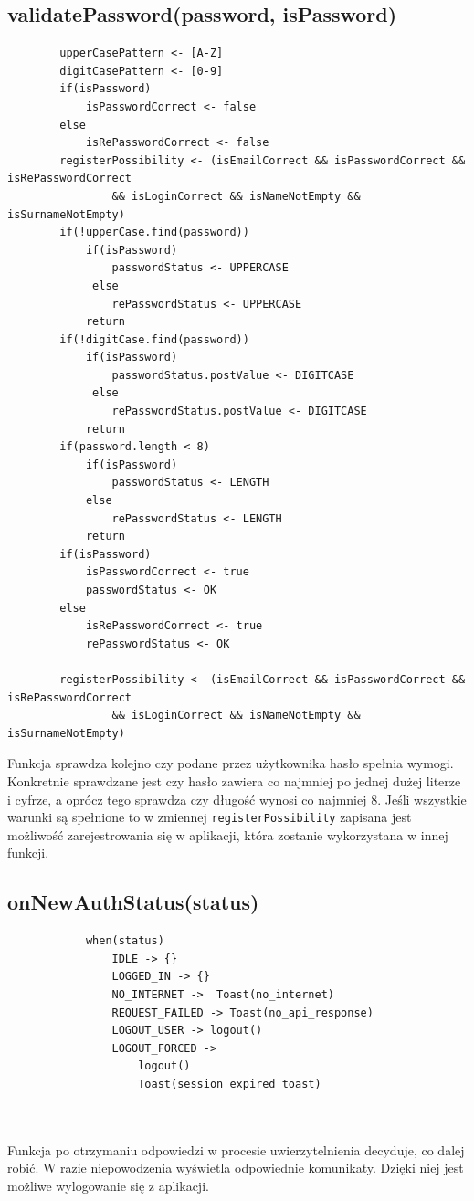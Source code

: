 \documentclass[polish, 11pt]{article}
\begin{document}
    \subsection{validatePassword(password, isPassword)}
         \begin{lstlisting}
        upperCasePattern <- [A-Z]
        digitCasePattern <- [0-9]
        if(isPassword)
            isPasswordCorrect <- false
        else 
            isRePasswordCorrect <- false
        registerPossibility <- (isEmailCorrect && isPasswordCorrect && isRePasswordCorrect
                && isLoginCorrect && isNameNotEmpty && isSurnameNotEmpty)
        if(!upperCase.find(password))
            if(isPassword)
                passwordStatus <- UPPERCASE
             else
                rePasswordStatus <- UPPERCASE
            return
        if(!digitCase.find(password))
            if(isPassword)
                passwordStatus.postValue <- DIGITCASE
             else
                rePasswordStatus.postValue <- DIGITCASE
            return
        if(password.length < 8)
            if(isPassword)
                passwordStatus <- LENGTH
            else
                rePasswordStatus <- LENGTH
            return
        if(isPassword)
            isPasswordCorrect <- true
            passwordStatus <- OK
        else 
            isRePasswordCorrect <- true
            rePasswordStatus <- OK
        
        registerPossibility <- (isEmailCorrect && isPasswordCorrect && isRePasswordCorrect
                && isLoginCorrect && isNameNotEmpty && isSurnameNotEmpty)
         \end{lstlisting}
         Funkcja sprawdza kolejno czy podane przez użytkownika hasło spełnia wymogi. Konkretnie sprawdzane jest czy hasło zawiera co najmniej po jednej dużej literze i cyfrze, a oprócz tego sprawdza czy długość wynosi co najmniej 8. Jeśli wszystkie warunki są spełnione to w zmiennej \texttt{registerPossibility} zapisana jest możliwość zarejestrowania się w aplikacji, która zostanie wykorzystana w innej funkcji.  
    \subsection{onNewAuthStatus(status)}
        \begin{lstlisting}
            when(status)
                IDLE -> {}
                LOGGED_IN -> {}
                NO_INTERNET ->  Toast(no_internet)
                REQUEST_FAILED -> Toast(no_api_response)
                LOGOUT_USER -> logout()
                LOGOUT_FORCED -> 
                    logout()
                    Toast(session_expired_toast)
              
            
        \end{lstlisting}
        Funkcja po otrzymaniu odpowiedzi w procesie uwierzytelnienia decyduje, co dalej robić. W razie niepowodzenia wyświetla odpowiednie komunikaty. Dzięki niej jest możliwe wylogowanie się z aplikacji.
\end{document}
